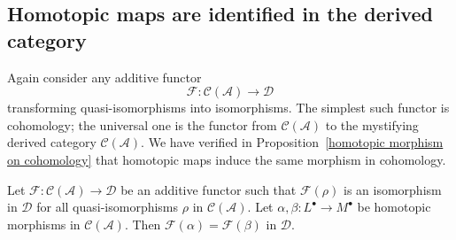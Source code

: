 \subsection{Homotopic maps are identified in the derived category}
Again consider any additive functor
\[\mathscr{F}:\mathcal{C}(\mathcal{A})\to\mathcal{D}\]
transforming quasi-isomorphisms into isomorphisms. The simplest such functor is cohomology; the universal one is the functor from $\mathcal{C}(\mathcal{A})$ to the mystifying derived category $\mathcal{C}(\mathcal{A})$. We have verified in Proposition~\ref{homotopic morphism on cohomology} that homotopic maps induce the same morphism in cohomology.
\begin{lemma}\label{quasi into iso homotopy}
Let $\mathscr{F}:\mathcal{C}(\mathcal{A})\to\mathcal{D}$ be an additive functor such that $\mathscr{F}(\rho)$ is an isomorphism in $\mathcal{D}$ for all quasi-isomorphisms $\rho$ in $\mathcal{C}(\mathcal{A})$. Let $\alpha,\beta:L^\bullet\to M^\bullet$ be homotopic morphisms in $\mathcal{C}(\mathcal{A})$. Then $\mathscr{F}(\alpha)=\mathscr{F}(\beta)$ in $\mathcal{D}$.
\end{lemma}

